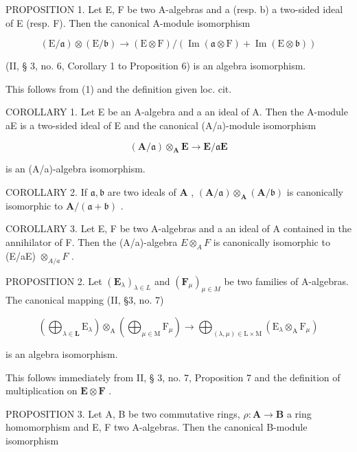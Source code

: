 PROPOSITION 1. Let E, F be two A-algebras and a (resp. b) a two-sided ideal of E (resp. F). Then the canonical A-module isomorphism

\[
(\mathrm{E} / \mathfrak {a}) \otimes (\mathrm{E} / \mathfrak {b}) \rightarrow (\mathrm{E} \otimes \mathrm{F}) / (\operatorname{Im} (\mathfrak {a} \otimes \mathrm{F}) + \operatorname{Im} (\mathrm{E} \otimes \mathfrak {b}))
\]

(II, § 3, no. 6, Corollary 1 to Proposition 6) is an algebra isomorphism.

This follows from (1) and the definition given loc. cit.

COROLLARY 1. Let E be an A-algebra and a an ideal of A. Then the A-module aE is a two-sided ideal of E and the canonical (A/a)-module isomorphism

\[
(\mathbf {A} / \mathfrak {a}) \otimes_ {\mathbf {A}} \mathbf {E} \rightarrow \mathbf {E} / \mathfrak {a} \mathbf {E}
\]

is an (A/a)-algebra isomorphism.

COROLLARY 2. If \(\mathfrak{a},\mathfrak{b}\) are two ideals of \(\mathbf{A}\) , \((\mathbf{A} / \mathfrak{a})\otimes_{\mathbf{A}}(\mathbf{A} / \mathfrak{b})\) is canonically isomorphic to \(\mathbf{A} / (\mathfrak{a} + \mathfrak{b})\) .

COROLLARY 3. Let E, F be two A-algebras and a an ideal of A contained in the annihilator of F. Then the (A/a)-algebra \(E \otimes_{A} F\) is canonically isomorphic to (E/aE) \(\otimes_{A/a} F\) .

PROPOSITION 2. Let \((\mathbf{E}_{\lambda})_{\lambda \in L}\) and \((\mathbf{F}_{\mu})_{\mu \in M}\) be two families of A-algebras. The canonical mapping (II, §3, no. 7)

\[
\left(\bigoplus_ {\lambda \in \mathbf {L}} \mathrm{E} _ {\lambda}\right) \otimes_ {\mathrm{A}} \left(\bigoplus_ {\mu \in \mathrm{M}} \mathrm{F} _ {\mu}\right)\rightarrow \bigoplus_ {(\lambda , \mu) \in \mathrm{L} \times \mathrm{M}} \left(\mathrm{E} _ {\lambda} \otimes_ {\mathrm{A}} \mathrm{F} _ {\mu}\right)
\]

is an algebra isomorphism.

This follows immediately from II, § 3, no. 7, Proposition 7 and the definition of multiplication on \(\mathbf{E} \otimes \mathbf{F}\) .

PROPOSITION 3. Let A, B be two commutative rings, \(\rho: \mathbf{A} \to \mathbf{B}\) a ring homomorphism and E, F two A-algebras. Then the canonical B-module isomorphism

